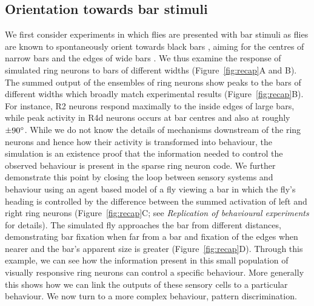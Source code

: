 \documentclass[10pt]{article}
\begin{document}
\subsection*{Orientation towards bar stimuli}
We first consider experiments in which flies are presented with bar stimuli as flies are known to spontaneously orient towards black bars \cite{Gotz1987}, aiming for the centres of narrow bars and the edges of wide bars \cite{Osorio1990}. We thus examine the response of simulated ring neurons to bars of different widths (Figure~\ref{fig:recap}A and B). The summed output of the ensembles of ring neurons show peaks to the bars of different widths which broadly match experimental results (Figure~\ref{fig:recap}B). For instance, R2 neurons respond maximally to the inside edges of large bars, while peak activity in R4d neurons occurs at bar centres and also at roughly $\pm 90\degree$. While we do not know the details of mechanisms downstream of the ring neurons and hence how their activity is transformed into behaviour, the simulation is an existence proof that the information needed to control the observed behaviour is present in the sparse ring neuron code. 
We further demonstrate this point by closing the loop between sensory systems and behaviour using an agent based model of a fly viewing a bar in which the fly’s heading is controlled by the difference between the summed activation of left and right ring neurons (Figure~\ref{fig:recap}C; see \emph{Replication of behavioural experiments} for details). The simulated fly approaches the bar from different distances, demonstrating bar fixation when far from a bar and fixation of the edges when nearer and the bar’s apparent size is greater (Figure~\ref{fig:recap}D). Through this example, we can see how the information present in this small population of visually responsive ring neurons can control a specific behaviour. More generally this shows how we can link the outputs of these sensory cells to a particular behaviour. We now turn to a more complex behaviour, pattern discrimination. 
\end{document}
